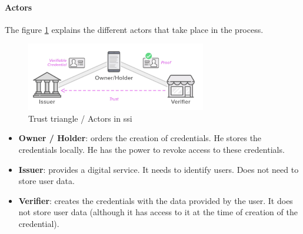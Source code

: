 \documentclass[a4paper, 12pt]{article} %
\begin{document}
                \paragraph{Actors}
                    The figure \ref{fig:trust-triangle} explains the different actors\cite{ssi-guide} that take place in the process.
                    \begin{figure}[h]
                        \centering
                        \includegraphics[width=0.7\textwidth]{trust-triangle.png}
                        \caption{Trust triangle / Actors in \acrshort{ssi}}
                        \label{fig:trust-triangle}
                    \end{figure}
                    \begin{itemize}
                        \item \textbf{Owner / Holder}: orders the creation of credentials. He stores the credentials locally. He has the power to revoke access to these credentials.
                        \item \textbf{Issuer}: provides a digital service. It needs to identify users. Does not need to store user data.
                        \item \textbf{Verifier}: creates the credentials with the data provided by the user. It does not store user data (although it has access to it at the time of creation of the credential).
                    \end{itemize}
            
\end{document}
